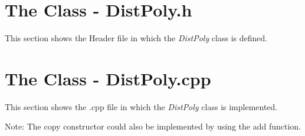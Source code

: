 \documentclass[11pt,titlepage]{article}
\begin{document}
	\section{The Class - DistPoly.h}
	This section shows the Header file in which the \emph{DistPoly} class is defined.
	
		
	
\newpage
	\section{The Class - DistPoly.cpp}
		This section shows the .cpp file in which the \emph{DistPoly} class is implemented.	
		
		
		Note: The copy constructor could also be implemented by using the add function.	
		
			
\end{document}
